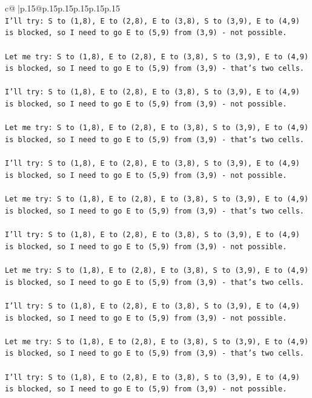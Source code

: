 \documentclass{article}
\begin{document}
{\begin{supertabular}{c@{$\;$}|p{.15\linewidth}@{}p{.15\linewidth}p{.15\linewidth}p{.15\linewidth}p{.15\linewidth}p{.15\linewidth}}
{{{\\ 
\texttt{I'll try: S to (1,8), E to (2,8), E to (3,8), S to (3,9), E to (4,9) is blocked, so I need to go E to (5,9) from (3,9) {-} not possible. } \\
\\ 
\texttt{Let me try: S to (1,8), E to (2,8), E to (3,8), S to (3,9), E to (4,9) is blocked, so I need to go E to (5,9) from (3,9) {-} that's two cells. } \\
\\ 
\texttt{I'll try: S to (1,8), E to (2,8), E to (3,8), S to (3,9), E to (4,9) is blocked, so I need to go E to (5,9) from (3,9) {-} not possible. } \\
\\ 
\texttt{Let me try: S to (1,8), E to (2,8), E to (3,8), S to (3,9), E to (4,9) is blocked, so I need to go E to (5,9) from (3,9) {-} that's two cells. } \\
\\ 
\texttt{I'll try: S to (1,8), E to (2,8), E to (3,8), S to (3,9), E to (4,9) is blocked, so I need to go E to (5,9) from (3,9) {-} not possible. } \\
\\ 
\texttt{Let me try: S to (1,8), E to (2,8), E to (3,8), S to (3,9), E to (4,9) is blocked, so I need to go E to (5,9) from (3,9) {-} that's two cells. } \\
\\ 
\texttt{I'll try: S to (1,8), E to (2,8), E to (3,8), S to (3,9), E to (4,9) is blocked, so I need to go E to (5,9) from (3,9) {-} not possible. } \\
\\ 
\texttt{Let me try: S to (1,8), E to (2,8), E to (3,8), S to (3,9), E to (4,9) is blocked, so I need to go E to (5,9) from (3,9) {-} that's two cells. } \\
\\ 
\texttt{I'll try: S to (1,8), E to (2,8), E to (3,8), S to (3,9), E to (4,9) is blocked, so I need to go E to (5,9) from (3,9) {-} not possible. } \\
\\ 
\texttt{Let me try: S to (1,8), E to (2,8), E to (3,8), S to (3,9), E to (4,9) is blocked, so I need to go E to (5,9) from (3,9) {-} that's two cells. } \\
\\ 
\texttt{I'll try: S to (1,8), E to (2,8), E to (3,8), S to (3,9), E to (4,9) is blocked, so I need to go E to (5,9) from (3,9) {-} not possible. } \\
}}}
\end{supertabular}}
\end{document}
